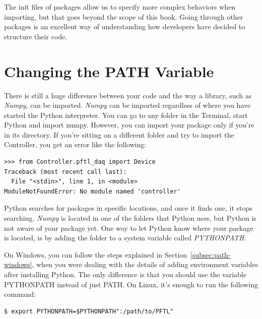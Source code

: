
The init files of packages allow us to specify more complex behaviors when importing, but that goes beyond the scope of this book. Going through other packages is an excellent way of understanding how developers have decided to structure their code.

\section{Changing the PATH Variable}\label{sec:path}
There is still a huge difference between your code and the way a library, such as \emph{Numpy}, can be imported. \emph{Numpy} can be imported regardless of where you have started the Python interpreter. You can go to any folder in the Terminal, start Python and import numpy. However, you can import your package only if you're in its directory. If you're sitting on a different folder and try to import the Controller, you get an error like the following:

\begin{verbatim}
>>> from Controller.pftl_daq import Device
Traceback (most recent call last):
  File "<stdin>", line 1, in <module>
ModuleNotFoundError: No module named 'controller'
\end{verbatim}

Python searches for packages in specific locations, and once it finds one, it stops searching. \emph{Numpy} is located in one of the folders that Python uses, but Python is not aware of your package yet. One way to let Python know where your package is located, is by adding the folder to a system variable called \emph{PYTHONPATH}.

On Windows, you can follow the steps explained in Section~\ref{subsec:path-windows}, when you were dealing with the details of adding environment variables after installing Python. The only difference is that you should use the variable PYTHONPATH instead of just PATH. On Linux, it's enough to run the following command:

\begin{verbatim}
$ export PYTHONPATH=$PYTHONPATH":/path/to/PFTL"
\end{verbatim}

